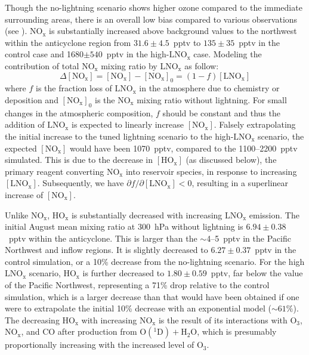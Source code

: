 Though the no-lightning scenario shows higher ozone compared to the immediate surrounding
areas, there is an overall low bias compared to various observations (see \citet[][manuscript in preparation]{Wong:2014xx}).
NO$_{\mathrm{x}}$ is substantially increased above background values to the northwest within the
anticyclone region from $31.6\pm4.5$~pptv to $135\pm35$~pptv in the control case
and 1680$\pm540$~pptv in the high-$\mathrm{LNO_x}$ case.
Modeling the contribution of total NO$_{\mathrm{x}}$ mixing ratio by
LNO$_{\mathrm{x}}$ as follow:
$$
\Delta[\mathrm{NO_x}] = [\mathrm{NO_x}]-[\mathrm{NO_x}]_0 = (1-f)[\mathrm{LNO_x}]
$$
where $f$ is the fraction loss of $\mathrm{LNO_x}$ in the atmosphere due to
chemistry or deposition and $[\mathrm{NO_x}]_0$ is the $\mathrm{NO_x}$
mixing ratio without lightning. For small changes in the atmospheric composition, $f$ should be
constant and thus the addition of $\mathrm{LNO_x}$ is expected to linearly
increase $[\mathrm{NO_x}]$. Falsely extrapolating the initial increase to the tuned
lightning scenario to the high-$\mathrm{LNO_x}$ scenario, the expected $[\mathrm{NO_x}]$
would have been 1070~pptv, compared to the 1100--2200~pptv simulated. This is due
to the decrease in $[\mathrm{HO_x}]$ (as discussed below), the primary reagent converting $\mathrm{NO_x}$ into
reservoir species, in response to increasing $[\mathrm{LNO_x}]$. Subsequently,
we have $\partial f/\partial[\mathrm{LNO_x}]<0$, resulting in a superlinear increase of $[\mathrm{NO_x}]$.

Unlike NO$_\mathrm{x}$, HO$_\mathrm{x}$ is substantially decreased with
increasing LNO$_\mathrm{x}$ emission. The initial August mean mixing ratio
at 300~hPa without lightning is $6.94\pm0.38$~pptv within the anticyclone. This
is larger than the $\sim$4--5~pptv in the Pacific Northwest and inflow regions. It
is slightly decreased to $6.27\pm0.37$~pptv in the control simulation, or a
10\% decrease from the no-lightning scenario. For the high $\mathrm{LNO_x}$
scenario, HO$_\mathrm{x}$ is further decreased to $1.80\pm0.59$~pptv, far
below the value of the Pacific Northwest, representing a 71\% drop relative to the
control simulation, which is a larger decrease than that would have been
obtained if one were to extrapolate the initial 10\% decrease with an
exponential model ($\sim61\%$). The decreasing  HO$_\mathrm{x}$ with
increasing NO$_\mathrm{x}$ is the result of its interactions with O$_3$,
NO$_\mathrm{x}$, and CO after production from $\mathrm{O(^1D)+H_2O}$,
which is presumably proportionally increasing with the increased level of
O$_3$.

